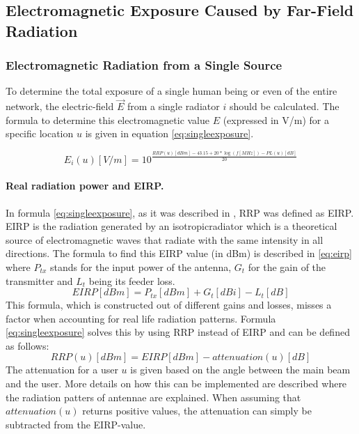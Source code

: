 \subsection{Electromagnetic Exposure Caused by Far-Field Radiation} %
\label{sub:Calculatingdownlinkexpsure}


\subsubsection{Electromagnetic Radiation from a Single Source}
\label{sec:calculatingexposure}

To determine the total exposure of a single human being or even of the entire network, the electric-field $\vec{E}$ from a single radiator $i$ should be calculated.
The formula to determine this electromagnetic value $E$ (expressed in V/m) for a specific location $u$ is given in equation \ref{eq:singleexposure}.

\begin{equation}
E_i(u) [V/m] = 10^{\frac{RRP(u)[dBm] - 43.15 + 20*\log(f [MHz])- PL(u) [dB]}{20}}
\label{eq:singleexposure}
\end{equation}

\paragraph{Real radiation power and EIRP.}
In formula \ref{eq:singleexposure}, as it was described in \cite{J6_originalExposureFormula, J1}, 
\gls{RRP} was defined as \gls{EIRP}. \gls{EIRP} is the radiation generated by an \gls{isotropicradiator} which is
a theoretical source of electromagnetic waves that radiate with the same intensity in all directions. 
The formula to find this \gls{EIRP} value (in dBm) is described in \ref{eq:eirp}
where $P_{tx}$ stands for the input power of the antenna, $G_t$ for the gain of the transmitter and $L_t$ being its feeder loss.
\begin{equation}
EIRP [dBm] = P_{tx} [dBm] + G_t [dBi]- L_t [dB]
\label{eq:eirp}
\end{equation}
This formula, which is constructed out of different gains and losses, misses a factor when accounting for real life radiation patterns.
Formula \ref{eq:singleexposure} solves this by using \gls{RRP} instead of \gls{EIRP} and can be defined as follows:
\begin{equation}
RRP(u) [dBm] = EIRP [dBm] - attenuation(u) [dB]
\label{eq:rrp}
\end{equation}
The attenuation for a user $u$ is given based on the angle between the main beam and the user. More details on how this can be implemented are described where the radiation patters of antennae are explained.
When assuming that $attenuation(u)$ returns positive values, the attenuation can simply be subtracted from the EIRP-value.

